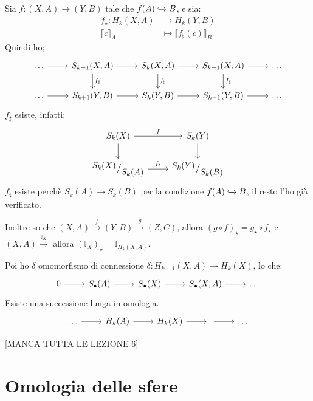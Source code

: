 \documentclass[10pt, twoside=false, x11names]{scrbook}
\newcommand{\Id}[1][]{\mathbb{I}_#1}
\newcommand{\incl}{\xhookrightarrow{}}
\newcommand*\quot[2]{{^{\textstyle #1}\big/_{\textstyle #2}}}
\begin{document}
Sia $ f \colon (X,A) \to (Y,B) $ tale che $ f(A) \incl B $, e sia:
\begin{align*}
  f_\star \colon H_k(X,A) & \to H_k(Y,B) \\
  \llbracket c \rrbracket_ A & \mapsto  \llbracket f_\sharp(c) \rrbracket_ B
\end{align*}
Quindi ho;
\[
  \begin{tikzcd}
    \dots \arrow{r}{} & S_{k+1}(X,A) \arrow{r}{} \arrow{d}{f_\sharp} & S_k(X,A) \arrow{r}{}  \arrow{d}{f_\sharp} & S_{k-1}(X,A) \arrow{r}{}  \arrow{d}{f_\sharp} & \dots \\
    \dots \arrow{r}{} & S_{k+1}(Y,B) \arrow{r}{} & S_k(Y,B) \arrow{r}{} & S_{k-1}(Y,B) \arrow{r}{} & \dots
  \end{tikzcd}
\]
$ f_\sharp $ esiste, infatti:
\[
  \begin{tikzcd}
    S_{k}(X) \arrow{r}{f} \arrow{d}{} & S_k(Y)  \arrow{d}{}  \\
    \quot{S_k(X)}{S_k(A)} \arrow{r}{f_\sharp} & \quot{S_k(Y)}{S_k(B)}
  \end{tikzcd}
\]
$ f_\sharp $ esiste perchè $ S_k(A) \to S_k(B) $ per la condizione $ f(A) \incl B $,
il resto l'ho già verificato.

Inoltre so che $ (X,A) \overset{f}{\to} (Y,B) \overset{g}{\to} (Z,C) $, allora
$ (g \circ f)_\star = g_\star \circ f_\star $ e $ (X,A) \overset{\Id{X}}{\to} $
allora $ (\Id{X})_\star = \Id{H_k(X,A)} $.

Poi ho $ \delta $ omomorfismo di connessione $ \delta \colon H_{k+1}(X,A) \to H_k(X) $,
lo che:
\[
  \begin{tikzcd}
    0 \arrow{r}{} & S_\bullet(A) \arrow{r}{} & S_\bullet(X) \arrow{r}{} & S_\bullet(X,A) \arrow{r}{} & \dots
  \end{tikzcd}
\]
Esiste una successione lunga in omologia.
\[
  \begin{tikzcd}
    \dots \arrow{r}{} & H_k(A) \arrow{r}{} & H_k(X) \arrow{r}{} & \arrow{r}{} & \dots
  \end{tikzcd}
\]


[MANCA TUTTA LE LEZIONE 6]


\section{Omologia delle sfere}
\end{document}
